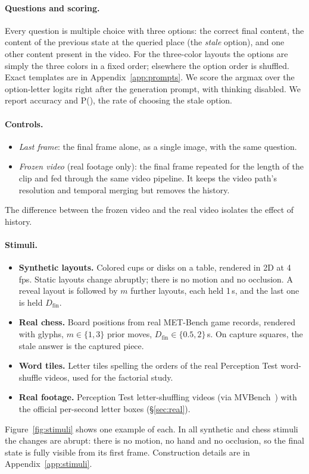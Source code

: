 \documentclass[10pt,twocolumn,letterpaper]{article}
\newcommand{\pstale}{P(\text{stale})}
\begin{document}
\paragraph{Questions and scoring.} Every question is multiple choice with three options: the correct final content, the content of the previous state at the queried place (the \emph{stale} option), and one other content present in the video. For the three-color layouts the options are simply the three colors in a fixed order; elsewhere the option order is shuffled. Exact templates are in Appendix~\ref{app:prompts}. We score the argmax over the option-letter logits right after the generation prompt, with thinking disabled. We report accuracy and \pstale, the rate of choosing the stale option.

\paragraph{Controls.}
\begin{itemize}
  \item \emph{Last frame}: the final frame alone, as a single image, with the same question.
  \item \emph{Frozen video} (real footage only): the final frame repeated for the length of the clip and fed through the same video pipeline. It keeps the video path's resolution and temporal merging but removes the history.
\end{itemize}
The difference between the frozen video and the real video isolates the effect of history.

\paragraph{Stimuli.}
\begin{itemize}
  \item \textbf{Synthetic layouts.} Colored cups or disks on a table, rendered in 2D at 4\,fps. Static layouts change abruptly; there is no motion and no occlusion. A reveal layout is followed by $m$ further layouts, each held 1\,s, and the last one is held $D_\text{fin}$.
  \item \textbf{Real chess.} Board positions from real MET-Bench game records, rendered with glyphs, $m\in\{1,3\}$ prior moves, $D_\text{fin}\in\{0.5,2\}$\,s. On capture squares, the stale answer is the captured piece.
  \item \textbf{Word tiles.} Letter tiles spelling the orders of the real Perception Test word-shuffle videos, used for the factorial study.
  \item \textbf{Real footage.} Perception Test letter-shuffling videos (via MVBench~\cite{li2024mvbench}) with the official per-second letter boxes (\S\ref{sec:real}).
\end{itemize}
Figure~\ref{fig:stimuli} shows one example of each. In all synthetic and chess stimuli the changes are abrupt: there is no motion, no hand and no occlusion, so the final state is fully visible from its first frame. Construction details are in Appendix~\ref{app:stimuli}.
\end{document}
